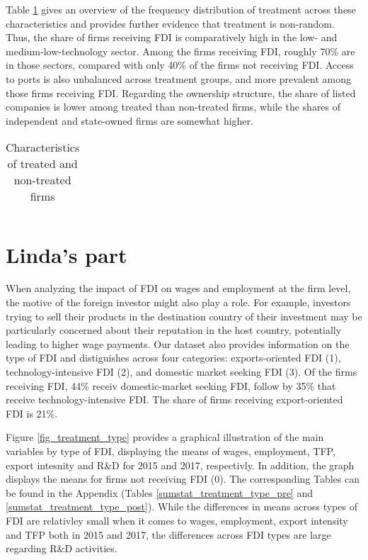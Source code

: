 \documentclass[11pt]{article}
\begin{document}
Table \ref{treatment_char} gives an overview of the frequency distribution of treatment across these characteristics and provides further evidence that treatment is non-random. Thus, the share of firms receiving FDI is comparatively high in the low- and medium-low-technology sector. Among the firms receiving FDI, roughly 70\% are in those sectors, compared with only 40\% of the firms not receiving FDI. Access to ports is also unbalanced across treatment groups, and more prevalent among those firms receiving FDI. Regarding the ownership structure, the share of listed companies is lower among treated than non-treated firms, while the shares of independent and state-owned firms are somewhat higher. 


\begin{centering}
\begin{table}[htbp]\centering \caption{Characteristics of treated and non-treated firms\label{treatment_char}}
\begin{tabular}[htbp!]{lrrrrrrrrrr}
\hline\hline

\hline\hline
\end{tabular} 
 \end{table}
 \end{centering}
 
 
 \section{Linda's part}
 
When analyzing the impact of FDI on wages and employment at the firm level, the  motive of the foreign investor might also play a role. For example, investors trying to sell their products in the destination country of their investment  may be particularly concerned about their reputation in the host country, potentially leading to higher wage payments. Our dataset also provides information on the type of FDI and distiguishes across four categories: exports-oriented FDI (1),  technology-intensive FDI (2), and domestic market seeking FDI (3). Of the firms receiving FDI, 44\% receiv domestic-market seeking FDI, follow by 35\% that receive technology-intensive FDI. The share of firms receiving export-oriented FDI is 21\%.

Figure \ref{fig_treatment_type} provides a graphical illustration of the main variables by type of FDI, displaying the means of wages, employment, TFP, export intesnity and R\&D for 2015 and 2017, respectivly. In addition, the graph displays the means for firms not receiving FDI (0). The corresponding Tables can be found in the Appendix (Tables \ref{sumstat_treatment_type_pre} and \ref{sumstat_treatment_type_post}). While the differences in means across types of FDI are relativley small when it comes to wages, employment, export intensity and TFP both in 2015 and 2017, the differences across FDI types are large regarding R\&D activities.
\end{document}
